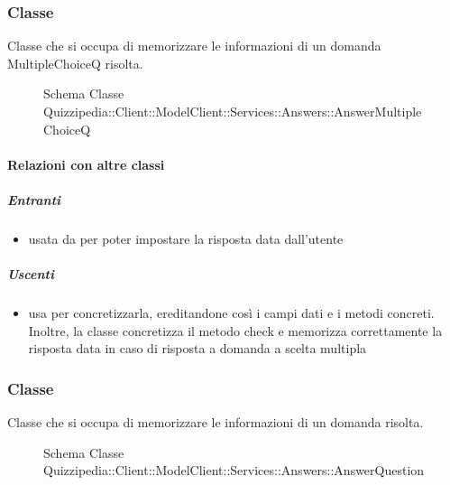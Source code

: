 \subsubsection{Classe }
Classe che si occupa di memorizzare le informazioni di un domanda MultipleChoiceQ risolta.
\begin{figure}[H]
\centering
\noindent{}
\caption[Schema Classe AnswerMultipleChoiceQ]{Schema Classe Quizzipedia::Client::ModelClient::Services::Answers::AnswerMultipleChoiceQ}
\end{figure}
\paragraph{Relazioni con altre classi}
\subparagraph{Entranti}
\begin{itemize}
\item usata da  per poter impostare la risposta data dall'utente
\end{itemize}
\subparagraph{Uscenti}
\begin{itemize}
\item usa  per concretizzarla, ereditandone così i campi dati e i metodi concreti. Inoltre, la classe concretizza il metodo check e memorizza correttamente la risposta data in caso di risposta a domanda a scelta multipla
\end{itemize}
\subsubsection{Classe }
Classe che si occupa di memorizzare le informazioni di un domanda risolta.
\begin{figure}[H]
\centering
\noindent{}
\caption[Schema Classe AnswerQuestion]{Schema Classe Quizzipedia::Client::ModelClient::Services::Answers::AnswerQuestion}
\end{figure}
